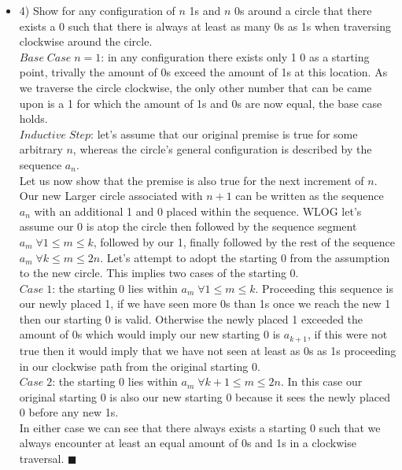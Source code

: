 \documentclass[ 12pt ]{article}
\begin{document}
\begin{itemize}
	\item[] {\large 4)}
	Show for any configuration of $n$ 1s and $n$ 0s around a circle that there exists a 0 such that there is always at least as many 0s as 1s
	when traversing clockwise around the circle. \\
	$Base\; Case\; n=1$: in any configuration there exists only 1 0 as a starting point, trivally the amount of 0s exceed the amount of 1s at this location.
	As we traverse the circle clockwise, the only other number that can be came upon is a 1 for which the amount of 1s and 0s are now equal, the base case holds. \\
	$Inductive\; Step$: let's assume that our original premise is true for some arbitrary $n$, whereas the circle's general configuration is described by the sequence $a_n$. \\
	Let us now show that the premise is also true for the next increment of $n$. Our new Larger circle associated with $n+1$ can be written as the sequence $a_n$
	with an additional 1 and 0 placed within the sequence. WLOG let's assume our 0 is atop the circle then followed by the sequence segment $a_m\; \forall 1 \leq m \leq k$,
	followed by our 1, finally followed by the rest of the sequence $a_m\; \forall k \leq m \leq 2n$. Let's attempt to adopt the starting 0 from the assumption to the new
	circle. This implies two cases of the starting 0. \\
	$Case\; 1$: the starting 0 lies within $a_m\; \forall 1 \leq m \leq k$. Proceeding this sequence is our newly placed 1, if we have seen more 0s than 1s once we reach the
	new 1 then our starting 0 is valid. Otherwise the newly placed 1 exceeded the amount of 0s which would imply our new starting 0 is $a_{k+1}$, if this were not true then
	it would imply that we have not seen at least as 0s as 1s proceeding in our clockwise path from the original starting 0. \\
	$Case\; 2$: the starting 0 lies within $a_m\; \forall k+1 \leq m \leq 2n$. In this case our original starting 0 is also our new starting 0 because it sees the newly placed 0
	before any new 1s. \\
	In either case we can see that there always exists a starting 0 such that we always encounter at least an equal amount of 0s and 1s in a clockwise traversal. $\blacksquare$


\end{itemize}
\end{document}
